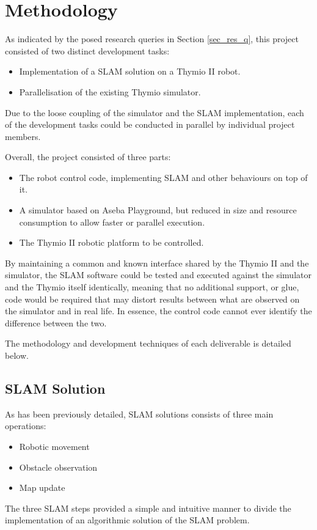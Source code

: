 \section{Methodology}
As indicated by the posed research queries in Section \ref{sec_res_q},
this project consisted of two distinct development tasks:

\begin{itemize}
\item Implementation of a SLAM solution on a Thymio II robot.
\item Parallelisation of the existing Thymio simulator.
\end{itemize}

Due to the loose coupling of the simulator and the SLAM implementation, each of
the development tasks could be conducted in parallel by individual project
members.

Overall, the project consisted of three parts:
\begin{itemize}
    \item The robot control code, implementing SLAM and other behaviours
        on top of it.
    \item A simulator based on Aseba Playground, but reduced in size and
        resource consumption to allow faster or parallel execution.
    \item The Thymio II robotic platform to be controlled.
\end{itemize}
By maintaining a common and known interface shared by the Thymio II and the
simulator, the SLAM software could be tested and executed against the simulator
and the Thymio itself identically, meaning that no additional support, or glue,
code would be required that may distort results between what are observed on
the simulator and in real life. In essence, the control code cannot ever
identify the difference between the two.

The methodology and development techniques of each deliverable is detailed
below.

\subsection{SLAM Solution}\label{meth_slam}
As has been previously detailed, SLAM solutions consists of three main
operations:
\begin{itemize}
    \item Robotic movement
    \item Obstacle observation
    \item Map update
\end{itemize}
The three SLAM steps provided a simple and intuitive manner to divide the
implementation of an algorithmic solution of the SLAM problem.


